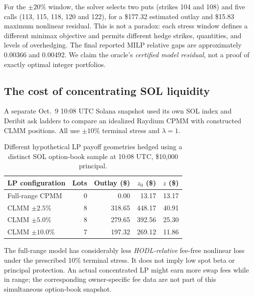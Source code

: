 For the $\pm20\%$ window, the solver selects two puts (strikes 104 and 108) and five calls (113, 115, 118, 120 and 122), for a \$177.32 estimated outlay and \$15.83 maximum nonlinear residual. This is not a paradox: each stress window defines a different minimax objective and permits different hedge strikes, quantities, and levels of overhedging. The final reported MILP relative gaps are approximately 0.00366 and 0.00492. We claim the oracle's \emph{certified model residual}, not a proof of exactly optimal integer portfolios.

\subsection{The cost of concentrating SOL liquidity}
A separate Oct.\ 9 10:08 UTC Solana snapshot used its own SOL index and Deribit ask ladders to compare an idealized Raydium CPMM with constructed CLMM positions. All use $\pm10\%$ terminal stress and $\lambda=1$.

\begin{table}[ht]
\centering
\caption{Different hypothetical LP payoff geometries hedged using a distinct SOL option-book sample at 10:08 UTC, \$10,000 principal.}
\label{tab:sol}
\small
\begin{tabular}{@{}lrrrr@{}}
\toprule
LP configuration & Lots & Outlay (\$) & $z_0$ (\$) & $z$ (\$)\\
\midrule
Full-range CPMM & 0 & 0.00 & 13.17 & 13.17\\
CLMM $\pm2.5\%$ & 8 & 318.65 & 448.17 & 40.91\\
CLMM $\pm5.0\%$ & 8 & 279.65 & 392.56 & 25.30\\
CLMM $\pm10.0\%$ & 7 & 197.32 & 269.12 & 11.86\\
\bottomrule
\end{tabular}
\end{table}
The full-range model has considerably less \emph{HODL-relative} fee-free nonlinear loss under the prescribed 10\% terminal stress. It does not imply low spot beta or principal protection. An actual concentrated LP might earn more swap fees while in range; the corresponding owner-specific fee data are not part of this simultaneous option-book snapshot.


